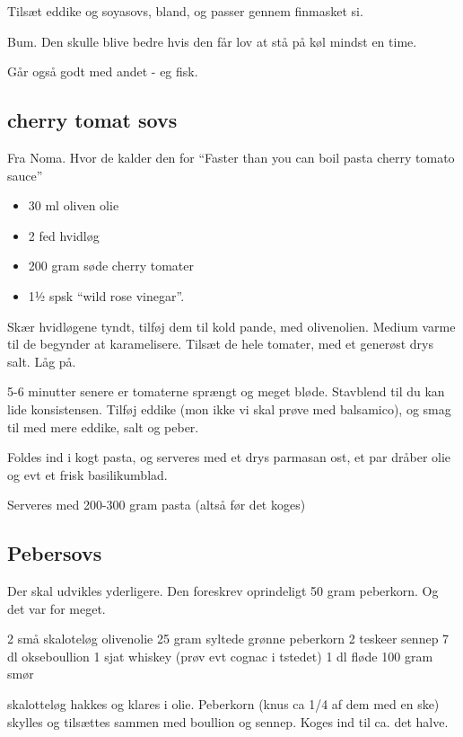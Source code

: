 \documentclass[
]{book}
\providecommand{\tightlist}{%
  \setlength{\itemsep}{0pt}\setlength{\parskip}{0pt}}
\begin{document}
Tilsæt eddike og soyasovs, bland, og passer gennem finmasket si.

Bum. Den skulle blive bedre hvis den får lov at stå på køl mindst en time.

Går også godt med andet - eg fisk.

\hypertarget{cherry-tomat-sovs}{%
\subsection{cherry tomat sovs}\label{cherry-tomat-sovs}}

Fra Noma. Hvor de kalder den for ``Faster than you can boil pasta cherry tomato sauce''

\begin{itemize}
\tightlist
\item
  30 ml oliven olie
\item
  2 fed hvidløg
\item
  200 gram søde cherry tomater
\item
  1½ spsk ``wild rose vinegar''.
\end{itemize}

Skær hvidløgene tyndt, tilføj dem til kold pande, med olivenolien.
Medium varme til de begynder at karamelisere.
Tilsæt de hele tomater, med et generøst drys salt. Låg på.

5-6 minutter senere er tomaterne sprængt og meget bløde. Stavblend til du kan lide konsistensen. Tilføj
eddike (mon ikke vi skal prøve med balsamico), og smag til med mere eddike, salt og peber.

Foldes ind i kogt pasta, og serveres med et drys parmasan ost, et par dråber olie og evt et frisk basilikumblad.

Serveres med 200-300 gram pasta (altså før det koges)

\hypertarget{pebersovs}{%
\subsection{Pebersovs}\label{pebersovs}}

Der skal udvikles yderligere.
Den foreskrev oprindeligt 50 gram peberkorn. Og det var for meget.

2 små skaloteløg
olivenolie
25 gram syltede grønne peberkorn
2 teskeer sennep
7 dl okseboullion
1 sjat whiskey (prøv evt cognac i tstedet)
1 dl fløde
100 gram smør

skalotteløg hakkes og klares i olie.
Peberkorn (knus ca 1/4 af dem med en ske) skylles og tilsættes
sammen med boullion og sennep. Koges ind til ca. det halve.
\end{document}
